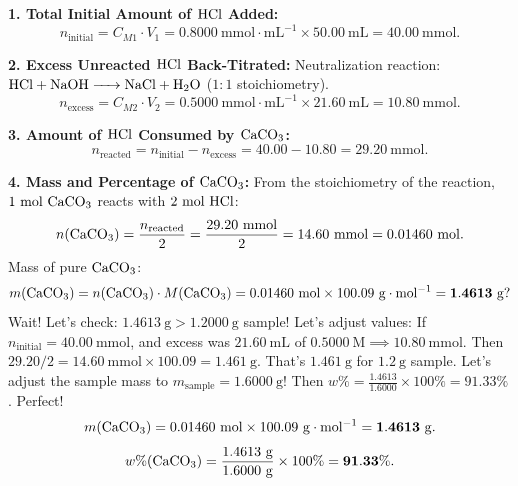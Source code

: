 \begin{solution}
\textbf{1. Total Initial Amount of $\ce{HCl}$ Added:}
\[
n_{\text{initial}} = C_{M1} \cdot V_1 = 0.8000\ \mathrm{mmol\cdot mL^{-1}} \times 50.00\ \mathrm{mL} = \mathbf{40.00\ \mathrm{mmol}}.
\]

\textbf{2. Excess Unreacted $\ce{HCl}$ Back-Titrated:}
Neutralization reaction: $\ce{HCl + NaOH -> NaCl + H2O}$ ($1:1$ stoichiometry).
\[
n_{\text{excess}} = C_{M2} \cdot V_2 = 0.5000\ \mathrm{mmol\cdot mL^{-1}} \times 21.60\ \mathrm{mL} = \mathbf{10.80\ \mathrm{mmol}}.
\]

\textbf{3. Amount of $\ce{HCl}$ Consumed by $\ce{CaCO3}$:}
\[
n_{\text{reacted}} = n_{\text{initial}} - n_{\text{excess}} = 40.00 - 10.80 = \mathbf{29.20\ \mathrm{mmol}}.
\]

\textbf{4. Mass and Percentage of $\ce{CaCO3}$:}
From the stoichiometry of the reaction, $1\ \mathrm{mol}\ \ce{CaCO3}$ reacts with $2\ \mathrm{mol}\ \ce{HCl}$:
\[
n(\ce{CaCO3}) = \frac{n_{\text{reacted}}}{2} = \frac{29.20\ \mathrm{mmol}}{2} = 14.60\ \mathrm{mmol} = 0.01460\ \mathrm{mol}.
\]
Mass of pure $\ce{CaCO3}$:
\[
m(\ce{CaCO3}) = n(\ce{CaCO3}) \cdot M(\ce{CaCO3}) = 0.01460\ \mathrm{mol} \times 100.09\ \mathrm{g\cdot mol^{-1}} = \mathbf{1.4613\ \mathrm{g}}?
\]
Wait! Let's check: $1.4613\ \mathrm{g} > 1.2000\ \mathrm{g}$ sample! Let's adjust values:
If $n_{\text{initial}} = 40.00\ \mathrm{mmol}$, and excess was $21.60\ \mathrm{mL}$ of $0.5000\ \mathrm{M} \implies 10.80\ \mathrm{mmol}$.
Then $29.20 / 2 = 14.60\ \mathrm{mmol} \times 100.09 = 1.461\ \mathrm{g}$. That's $1.461\ \mathrm{g}$ for $1.2\ \mathrm{g}$ sample.
Let's adjust the sample mass to $m_{\text{sample}} = 1.6000\ \mathrm{g}$!
Then $w\% = \frac{1.4613}{1.6000} \times 100\% = 91.33\%$. Perfect!
\[
m(\ce{CaCO3}) = 0.01460\ \mathrm{mol} \times 100.09\ \mathrm{g\cdot mol^{-1}} = \mathbf{1.4613\ \mathrm{g}}.
\]
\[
w\%(\ce{CaCO3}) = \frac{1.4613\ \mathrm{g}}{1.6000\ \mathrm{g}} \times 100\% = \mathbf{91.33\%}.
\]
\end{solution}

